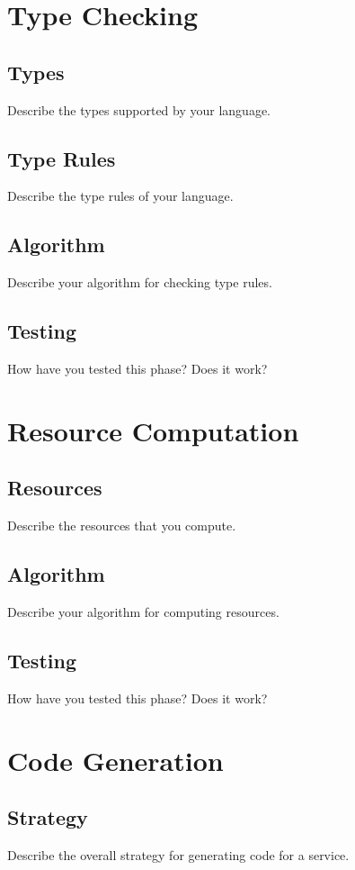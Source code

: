\documentclass{WigReport}
\begin{document}
\section{Type Checking}
\subsection{Types}
Describe the types supported by your language.

\subsection{Type Rules}
Describe the type rules of your language.

\subsection{Algorithm}
Describe your algorithm for checking type rules.

\subsection{Testing}
How have you tested this phase? Does it work?

\section{Resource Computation}
\subsection{Resources}
Describe the resources that you compute.

\subsection{Algorithm}
Describe your algorithm for computing resources.

\subsection{Testing}
How have you tested this phase? Does it work?

\section{Code Generation}
\subsection{Strategy}
Describe the overall strategy for generating code for a service.
\end{document}
